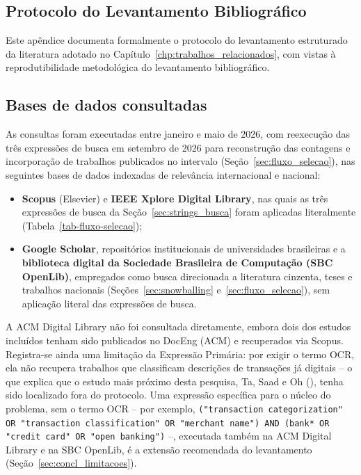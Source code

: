 
\begin{apendicesenv}
\partapendices

\chapter{Protocolo do Levantamento Bibliográfico}
\label{apendice:protocolo_busca}

Este apêndice documenta formalmente o protocolo do levantamento estruturado da literatura adotado no Capítulo~\ref{chp:trabalhos_relacionados}, com vistas à reprodutibilidade metodológica do levantamento bibliográfico.

\section{Bases de dados consultadas}
\label{sec:bases_dados}
As consultas foram executadas entre janeiro e maio de 2026, com reexecução das três expressões de busca em setembro de 2026 para reconstrução das contagens e incorporação de trabalhos publicados no intervalo (Seção~\ref{sec:fluxo_selecao}), nas seguintes bases de dados indexadas de relevância internacional e nacional:
\begin{itemize}
	\item \textbf{Scopus} (Elsevier) e \textbf{IEEE Xplore Digital Library}, nas quais as três expressões de busca da Seção~\ref{sec:strings_busca} foram aplicadas literalmente (Tabela~\ref{tab-fluxo-selecao});
	\item \textbf{Google Scholar}, repositórios institucionais de universidades brasileiras e a \textbf{biblioteca digital da Sociedade Brasileira de Computação (SBC OpenLib)}, empregados como busca direcionada a literatura cinzenta, teses e trabalhos nacionais (Seções~\ref{sec:snowballing} e~\ref{sec:fluxo_selecao}), sem aplicação literal das expressões de busca.
\end{itemize}

A ACM Digital Library não foi consultada diretamente, embora dois dos estudos incluídos tenham sido publicados no DocEng (ACM) e recuperados via Scopus. Registra-se ainda uma limitação da Expressão Primária: por exigir o termo OCR, ela não recupera trabalhos que classificam descrições de transações já digitais -- o que explica que o estudo mais próximo desta pesquisa, Ta, Saad e Oh (\citeyear{ta2023specialized}), tenha sido localizado fora do protocolo. Uma expressão específica para o núcleo do problema, sem o termo OCR -- por exemplo, \texttt{("transaction categorization" OR "transaction classification" OR "merchant name") AND (bank* OR "credit card" OR "open banking")} --, executada também na ACM Digital Library e na SBC OpenLib, é a extensão recomendada do levantamento (Seção~\ref{sec:concl_limitacoes}).


\end{apendicesenv}
